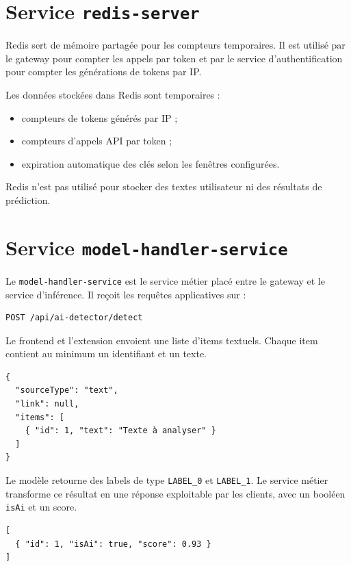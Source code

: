 ﻿\documentclass[12pt, a4paper]{report}
\begin{document}
\section{Service \texttt{redis-server}}

Redis sert de mémoire partagée pour les compteurs temporaires. Il est utilisé
par le gateway pour compter les appels par token et par le service
d'authentification pour compter les générations de tokens par IP.

Les données stockées dans Redis sont temporaires :

\begin{itemize}
  \item compteurs de tokens générés par IP ;
  \item compteurs d'appels API par token ;
  \item expiration automatique des clés selon les fenêtres configurées.
\end{itemize}

Redis n'est pas utilisé pour stocker des textes utilisateur ni des résultats de
prédiction.

\section{Service \texttt{model-handler-service}}

Le \texttt{model-handler-service} est le service métier placé entre le gateway
et le service d'inférence. Il reçoit les requêtes applicatives sur :

\begin{verbatim}
POST /api/ai-detector/detect
\end{verbatim}

Le frontend et l'extension envoient une liste d'items textuels. Chaque item
contient au minimum un identifiant et un texte.

\begin{verbatim}
{
  "sourceType": "text",
  "link": null,
  "items": [
    { "id": 1, "text": "Texte à analyser" }
  ]
}
\end{verbatim}

Le modèle retourne des labels de type \texttt{LABEL\_0} et
\texttt{LABEL\_1}. Le service métier transforme ce résultat en une réponse
exploitable par les clients, avec un booléen \texttt{isAi} et un score.

\begin{verbatim}
[
  { "id": 1, "isAi": true, "score": 0.93 }
]
\end{verbatim}
\end{document}
